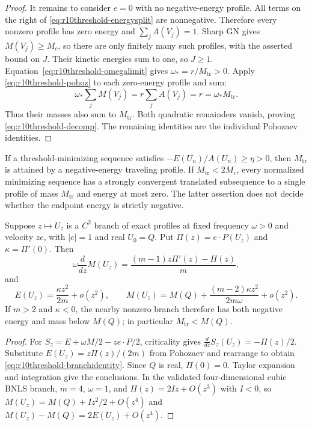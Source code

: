 \begin{proof}
It remains to consider $e=0$ with no negative-energy profile.
All terms on the right of \eqref{eq:r10threshold-energysplit} are
nonnegative. Therefore every nonzero profile has zero energy and
$\sum_jA(V_j)=1$. Sharp GN gives $M(V_j)\ge M_c$, so there are
only finitely many such profiles, with the asserted bound on $J$.
Their kinetic energies sum to one, so $J\ge1$.
Equation~\eqref{eq:r10threshold-omegalimit} gives
$\omega_*=r/M_{\mathrm{tr}}>0$. Apply
\eqref{eq:r10threshold-pohoz} to each zero-energy profile and sum:
\[
 \omega_*\sum_jM(V_j)=r\sum_jA(V_j)=r
 =\omega_*M_{\mathrm{tr}}.
\]
Thus their masses also sum to $M_{\mathrm{tr}}$. Both quadratic
remainders vanish, proving \eqref{eq:r10threshold-decomp}. The
remaining identities are the individual Pohozaev identities.
\end{proof}

\begin{corollary}
If a threshold-minimizing sequence satisfies
$-E(U_n)/A(U_n)\ge\eta>0$, then $M_{\mathrm{tr}}$ is attained by
a negative-energy traveling profile. If $M_{\mathrm{tr}}<2M_c$,
every normalized minimizing sequence has a strongly convergent
translated subsequence to a single profile of mass
$M_{\mathrm{tr}}$ and energy at most zero. The latter assertion
does not decide whether the endpoint energy is strictly negative.
\end{corollary}

\begin{proposition}
\label{prop:r10threshold-branch}
Suppose $z\mapsto U_z$ is a $C^2$ branch of exact profiles at fixed
frequency $\omega>0$ and velocity $ze$, with $|e|=1$ and real
$U_0=Q$. Put $\Pi(z)=e\cdot P(U_z)$ and $\kappa=\Pi'(0)$.
Then
\begin{equation}\label{eq:r10threshold-branchidentity}
 \omega\frac{d}{dz}M(U_z)
 =\frac{(m-1)z\Pi'(z)-\Pi(z)}{m},
\end{equation}
and
\[
 E(U_z)=\frac{\kappa z^2}{2m}+o(z^2),\qquad
 M(U_z)=M(Q)+\frac{(m-2)\kappa z^2}{2m\omega}+o(z^2).
\]
If $m>2$ and $\kappa<0$, the nearby nonzero branch therefore has
both negative energy and mass below $M(Q)$; in particular
$M_{\mathrm{tr}}<M(Q)$.
\end{proposition}
\begin{proof}
For $S_z=E+\omega M/2-z e\cdot P/2$, criticality gives
$\frac{d}{dz}S_z(U_z)=-\Pi(z)/2$.
Substitute $E(U_z)=z\Pi(z)/(2m)$ from Pohozaev and rearrange to
obtain \eqref{eq:r10threshold-branchidentity}.
Since $Q$ is real, $\Pi(0)=0$. Taylor expansion and integration give
the conclusions. In the validated four-dimensional cubic BNLS
branch, $m=4$, $\omega=1$, and
$\Pi(z)=2Iz+O(z^3)$ with $I<0$, so
$M(U_z)=M(Q)+Iz^2/2+O(z^4)$ and
$M(U_z)-M(Q)=2E(U_z)+O(z^4)$.
\end{proof}
